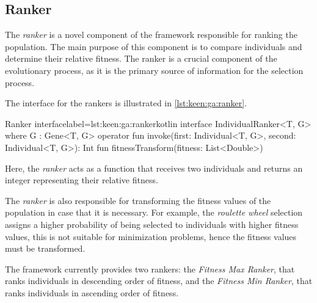\subsection{Ranker}
\label{sec:keen:ga:ranker}

  The \emph{ranker} is a novel component of the framework responsible for ranking the population.
  The main purpose of this component is to compare individuals and determine their relative fitness.
  The ranker is a crucial component of the evolutionary process, as it is the primary source of information for the 
  selection process.

  The interface for the rankers is illustrated in \vref{lst:keen:ga:ranker}.

  \begin{code}{Ranker interface}{label=lst:keen:ga:ranker}{kotlin}
    interface IndividualRanker<T, G> where G : Gene<T, G> {
        operator fun invoke(first: Individual<T, G>, second: Individual<T, G>): Int
        fun fitnessTransform(fitness: List<Double>)
    }
  \end{code}

  Here, the \emph{ranker} acts as a function that receives two individuals and returns an integer representing their
  relative fitness.
  
  The \emph{ranker} is also responsible for transforming the fitness values of the population in case that it is
  necessary. For example, the \textit{roulette wheel} selection assigns a higher probability of being selected to
  individuals with higher fitness values, this is not suitable for minimization problems, hence the fitness values must
  be transformed.

  The framework currently provides two rankers: the \textit{Fitness Max Ranker}, that ranks individuals in descending 
  order of fitness, and the \textit{Fitness Min Ranker}, that ranks individuals in ascending order of fitness.
